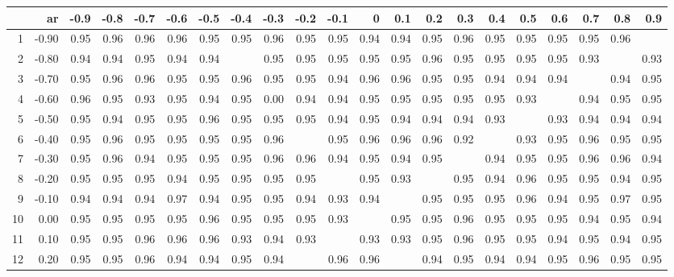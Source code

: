 \begin{table}[ht]
\centering
\begin{tabular}{rrrrrrrrrrrrrrrrrrrrr}
  \hline
 & ar & -0.9 & -0.8 & -0.7 & -0.6 & -0.5 & -0.4 & -0.3 & -0.2 & -0.1 & 0 & 0.1 & 0.2 & 0.3 & 0.4 & 0.5 & 0.6 & 0.7 & 0.8 & 0.9 \\ 
  \hline
1 & -0.90 & 0.95 & 0.96 & 0.96 & 0.96 & 0.95 & 0.95 & 0.96 & 0.95 & 0.95 & 0.94 & 0.94 & 0.95 & 0.96 & 0.95 & 0.95 & 0.95 & 0.95 & 0.96 &  \\ 
  2 & -0.80 & 0.94 & 0.94 & 0.95 & 0.94 & 0.94 &  & 0.95 & 0.95 & 0.95 & 0.95 & 0.95 & 0.96 & 0.95 & 0.95 & 0.95 & 0.95 & 0.93 &  & 0.93 \\ 
  3 & -0.70 & 0.95 & 0.96 & 0.96 & 0.95 & 0.95 & 0.96 & 0.95 & 0.95 & 0.94 & 0.96 & 0.96 & 0.95 & 0.95 & 0.94 & 0.94 & 0.94 &  & 0.94 & 0.95 \\ 
  4 & -0.60 & 0.96 & 0.95 & 0.93 & 0.95 & 0.94 & 0.95 & 0.00 & 0.94 & 0.94 & 0.95 & 0.95 & 0.95 & 0.95 & 0.95 & 0.93 &  & 0.94 & 0.95 & 0.95 \\ 
  5 & -0.50 & 0.95 & 0.94 & 0.95 & 0.95 & 0.96 & 0.95 & 0.95 & 0.95 & 0.94 & 0.95 & 0.94 & 0.94 & 0.94 & 0.93 &  & 0.93 & 0.94 & 0.94 & 0.94 \\ 
  6 & -0.40 & 0.95 & 0.96 & 0.95 & 0.95 & 0.95 & 0.95 & 0.96 &  & 0.95 & 0.96 & 0.96 & 0.96 & 0.92 &  & 0.93 & 0.95 & 0.96 & 0.95 & 0.95 \\ 
  7 & -0.30 & 0.95 & 0.96 & 0.94 & 0.95 & 0.95 & 0.95 & 0.96 & 0.96 & 0.94 & 0.95 & 0.94 & 0.95 &  & 0.94 & 0.95 & 0.95 & 0.96 & 0.96 & 0.94 \\ 
  8 & -0.20 & 0.95 & 0.95 & 0.95 & 0.94 & 0.95 & 0.95 & 0.95 & 0.95 &  & 0.95 & 0.93 &  & 0.95 & 0.94 & 0.96 & 0.95 & 0.95 & 0.94 & 0.95 \\ 
  9 & -0.10 & 0.94 & 0.94 & 0.94 & 0.97 & 0.94 & 0.95 & 0.95 & 0.94 & 0.93 & 0.94 &  & 0.95 & 0.95 & 0.95 & 0.96 & 0.94 & 0.95 & 0.97 & 0.95 \\ 
  10 & 0.00 & 0.95 & 0.95 & 0.95 & 0.95 & 0.96 & 0.95 & 0.95 & 0.95 & 0.93 &  & 0.95 & 0.95 & 0.96 & 0.95 & 0.95 & 0.95 & 0.94 & 0.95 & 0.94 \\ 
  11 & 0.10 & 0.95 & 0.95 & 0.96 & 0.96 & 0.96 & 0.93 & 0.94 & 0.93 &  & 0.93 & 0.93 & 0.95 & 0.96 & 0.95 & 0.95 & 0.94 & 0.95 & 0.94 & 0.95 \\ 
  12 & 0.20 & 0.95 & 0.95 & 0.96 & 0.94 & 0.94 & 0.95 & 0.94 &  & 0.96 & 0.96 &  & 0.94 & 0.95 & 0.94 & 0.94 & 0.95 & 0.96 & 0.95 & 0.95 \\ 

\end{tabular}
\end{table}
